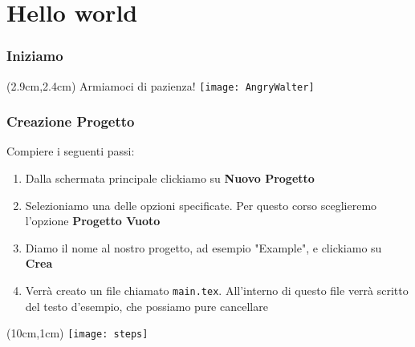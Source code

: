 \section{Hello world}
\begin{frame}
  \frametitle{Iniziamo}
  
    \begin{textblock*}{8cm}(2.9cm,2.4cm)
    \huge Armiamoci di pazienza!
      \texttt{[image: AngryWalter]}
    \end{textblock*}
    
\end{frame}

\begin{frame}

 \frametitle{Creazione Progetto}
 
 Compiere i seguenti passi:
 \begin{enumerate}
  \item<1-> Dalla schermata principale clickiamo su \textbf{Nuovo Progetto}
  \item<2-> Selezioniamo una delle opzioni specificate. Per questo corso sceglieremo l'opzione \textbf{Progetto Vuoto}
  \item<3-> Diamo il nome al nostro progetto, ad esempio "Example", e clickiamo su \textbf{Crea}
  \item<4-> Verrà creato un file chiamato \texttt{main.tex}. All'interno di questo file verrà scritto del testo d'esempio,
  che possiamo pure cancellare
 \end{enumerate}

 \begin{textblock*}{5cm}(10cm,1cm)
      \texttt{[image: steps]}
 \end{textblock*}
   
\end{frame}
